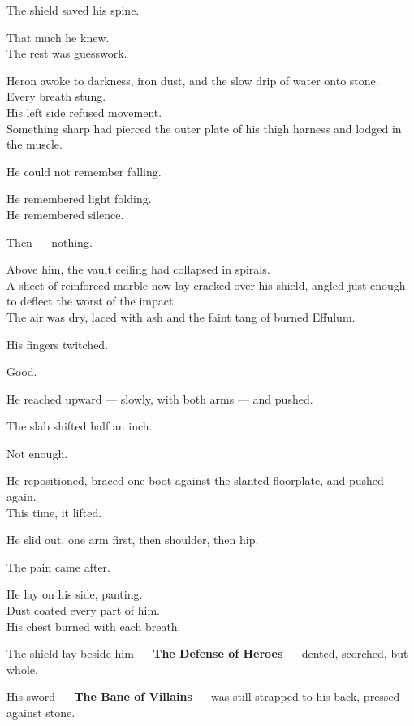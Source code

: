 \documentclass[9pt]{article}
\begin{document}
The shield saved his spine.

That much he knew.\\
The rest was guesswork.

Heron awoke to darkness, iron dust, and the slow drip of water onto stone.\\
Every breath stung.\\
His left side refused movement.\\
Something sharp had pierced the outer plate of his thigh harness and lodged in the muscle.

He could not remember falling.

He remembered light folding.\\
He remembered silence.

Then — nothing.

\vspace{1em}

Above him, the vault ceiling had collapsed in spirals.\\
A sheet of reinforced marble now lay cracked over his shield, angled just enough to deflect the worst of the impact.\\
The air was dry, laced with ash and the faint tang of burned Effulum.

His fingers twitched.

Good.

He reached upward — slowly, with both arms — and pushed.

The slab shifted half an inch.

Not enough.

\vspace{1em}

He repositioned, braced one boot against the slanted floorplate, and pushed again.\\
This time, it lifted.

He slid out, one arm first, then shoulder, then hip.

The pain came after.

\vspace{1em}

He lay on his side, panting.\\
Dust coated every part of him.\\
His chest burned with each breath.

The shield lay beside him — \textbf{The Defense of Heroes} — dented, scorched, but whole.

His sword — \textbf{The Bane of Villains} — was still strapped to his back, pressed against stone.
\end{document}
